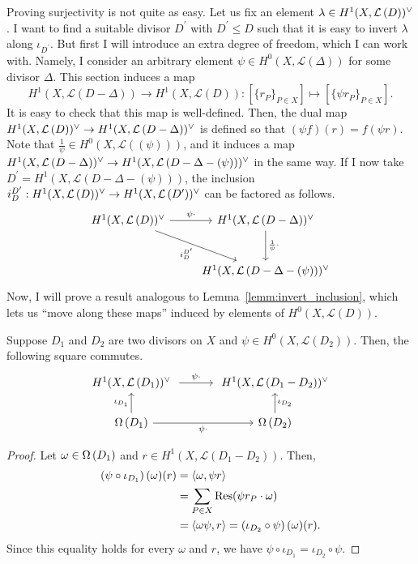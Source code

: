 Proving surjectivity is not quite as easy. Let us fix an element $\lambda
\in H^1(X,\mathcal{L}\left(D\right))^{\vee}$. I want to find a suitable divisor $D^{\prime}$ with
$D^{\prime}\leq D$ such that it is easy to invert $\lambda$ along
$\iota_{D^{\prime}}$. But first I will introduce an extra degree of freedom,
which I can work with. Namely, I consider an arbitrary element $\psi\in
H^{0}(X,\mathcal{L}(\Delta))$ for some divisor $\Delta$. This section induces
a map
\[H^{1}(X,\mathcal{L}(D-\Delta))\to H^{1}(X,\mathcal{L}(D))
:[\{r_{P}\}_{P\in X}]\mapsto [\{\psi r_{P}\}_{P\in X}].\]
It is easy to check that this map is well-defined. Then, the dual map
$H^1(X,\mathcal{L}\left(D\right))^{\vee}\to H^1(X,\mathcal{L}\left(D-\Delta\right))^{\vee}$ is defined so that $(\psi f)(r)
=f(\psi r)$. Note that $\frac1{\psi}\in H^{0}(X,\mathcal{L}((\psi)))$,
and it induces a map $H^1(X,\mathcal{L}\left(D-\Delta\right))^{\vee}\to H^1(X,\mathcal{L}\left(D-\Delta-(\psi)\right))^{\vee}$ in the same
way. If I now take $D^{\prime}=H^{1}(X,\mathcal{L}(D-\Delta-(\psi)))$,
the inclusion $i_{D}^{D^{\prime}}:H^1(X,\mathcal{L}\left(D\right))^{\vee}\to H^1(X,\mathcal{L}\left(D^{\prime}\right))^{\vee}$ can be
factored as follows.
\[\begin{tikzcd}[row sep=large]
    \dual{D}\rar["\psi\cdot"]\drar["i_{D}^{D^{\prime}}"']
    & \dual{D-\Delta}\dar["\frac1{\psi}\cdot"] \\ & \dual{D-\Delta-(\psi)}
  \end{tikzcd}\]
Now, I will prove a result analogous to Lemma~\ref{lemm:invert_inclusion},
which lets us ``move along these maps'' induced by elements of
$H^{0}(X,\mathcal{L}(D))$.
\begin{lemm}\label{lemm:invert_multiplication}
  Suppose $D_{1}$ and $D_{2}$ are two divisors on $X$ and $\psi
  \in H^{0}(X,\mathcal{L}(D_{2}))$. Then, the following square commutes.
  \[\begin{tikzcd}[column sep=large]
      \dual{D_{1}}\rar[shorten=.3em,"\psi\cdot"] & \dual{D_{1}-D_{2}} \\
      \diffs{D_{1}}\rar["\psi\cdot"']\uar["\iota_{D_{1}}"]
      & \diffs{D_{2}}\uar["\iota_{D_{2}}"']
    \end{tikzcd}\]
\end{lemm}
\begin{proof}
  Let $\omega\in\Omega\left(D_{1}\right)$ and $r\in H^{1}(X,\mathcal{L}(D_{1}-D_{2}))$.
  Then,
  \begin{align*}
    \left(\psi\circ\iota_{D_{1}}\right)(\omega)(r)
    &= \langle \omega, \psi r\rangle \\
    &= \sum_{P\in X}\operatorname{Res}(\psi r_{P}\cdot\omega) \\
    &= \langle \omega\psi, r\rangle=\left(\iota_{D_{2}}\circ\psi\right)
      (\omega)(r).
  \end{align*}
  Since this equality holds for every $\omega$ and $r$, we have
  $\psi\circ\iota_{D_{1}}=\iota_{D_{2}}\circ\psi$.
\end{proof}

